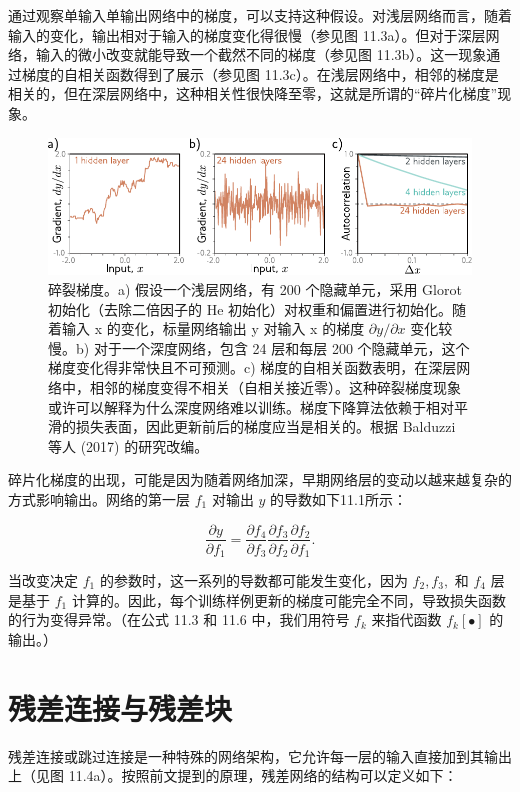 \documentclass[lang=cn,newtx,10pt,scheme=chinese]{elegantbook}
\begin{document}
通过观察单输入单输出网络中的梯度，可以支持这种假设。对浅层网络而言，随着输入的变化，输出相对于输入的梯度变化得很慢（参见图 11.3a）。但对于深层网络，输入的微小改变就能导致一个截然不同的梯度（参见图 11.3b）。这一现象通过梯度的自相关函数得到了展示（参见图 11.3c）。在浅层网络中，相邻的梯度是相关的，但在深层网络中，这种相关性很快降至零，这就是所谓的“碎片化梯度”现象。

\begin{figure}[ht!]
\centering
\includegraphics[width=0.7\linewidth]{PDFFigures/UDLChap11PDF/ResidualBalduzzi.pdf}
\caption{碎裂梯度。a) 假设一个浅层网络，有 200 个隐藏单元，采用 Glorot 初始化（去除二倍因子的 He 初始化）对权重和偏置进行初始化。随着输入 x 的变化，标量网络输出 y 对输入 x 的梯度 \(\partial y/\partial x\) 变化较慢。b) 对于一个深度网络，包含 24 层和每层 200 个隐藏单元，这个梯度变化得非常快且不可预测。c) 梯度的自相关函数表明，在深层网络中，相邻的梯度变得不相关（自相关接近零）。这种碎裂梯度现象或许可以解释为什么深度网络难以训练。梯度下降算法依赖于相对平滑的损失表面，因此更新前后的梯度应当是相关的。根据 Balduzzi 等人 (2017) 的研究改编。}
\end{figure}


碎片化梯度的出现，可能是因为随着网络加深，早期网络层的变动以越来越复杂的方式影响输出。网络的第一层 \(f_1\) 对输出 \(y\) 的导数如下11.1所示：

\begin{equation}
\frac{\partial y}{\partial f_1} = \frac{\partial f_4}{\partial f_3} \frac{\partial f_3}{\partial f_2} \frac{\partial f_2}{\partial f_1}. 
\end{equation}

当改变决定 \(f_1\) 的参数时，这一系列的导数都可能发生变化，因为 \(f_2, f_3,\) 和 \(f_4\) 层是基于 \(f_1\) 计算的。因此，每个训练样例更新的梯度可能完全不同，导致损失函数的行为变得异常。（在公式 11.3 和 11.6 中，我们用符号 \(f_k\) 来指代函数 \(f_k[•]\) 的输出。）


\section{残差连接与残差块}
残差连接或跳过连接是一种特殊的网络架构，它允许每一层的输入直接加到其输出上（见图 11.4a）。按照前文提到的原理，残差网络的结构可以定义如下：
\end{document}
